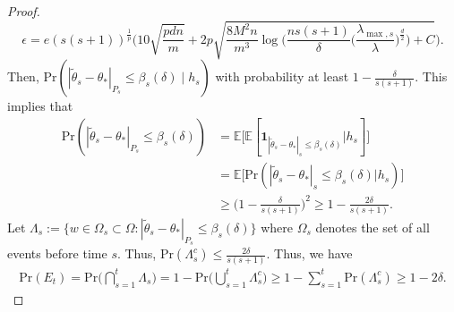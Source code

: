 \documentclass[11pt]{article}
\theoremstyle{plain}
\theoremstyle{definition}
\theoremstyle{remark}
\begin{document}
\begin{proof}
\[\epsilon = e (s(s+1))^{\frac{1}{p}}\Big(10\sqrt{\frac{pdn}{m}}+ 2p \sqrt{\frac{8M^2n}{m^3}\log \big(\frac{n s(s+1)}{\delta}\big(\frac{\lambda_{\max,s}}{\lambda}\big)^{\frac{d}{2}}\big)+C}\Big).\] 
Then, $\mathrm{Pr}(|\tilde{\theta}_s-\theta_*|_{P_s} \leq \beta_s(\delta) \mid h_{s})$
with probability at least $1-\frac{\delta}{s(s+1)}$.
This implies that 
\begin{align*}
\mathrm{Pr}(|\tilde{\theta}_s - \theta_*|_{P_s} \leq \beta_s(\delta)) &= \mathbb{E}\big [\mathbb{E}[\mathbf{1}_{|\tilde  \theta_s - \theta_*|_s \leq \beta_s(\delta)}|h_s]\big ]\\
&=\mathbb{E}\big [\mathrm{Pr}(|\tilde \theta_s - \theta_*|_s \leq \beta_s(\delta)|h_s)\big ] \\
& \geq \bigg (1-\frac{\delta}{s(s+1)}\bigg )^2
\geq 1-\frac{2\delta}{s(s+1)}.
\end{align*}
Let $\Lambda_s := \{w\in \Omega_s \subset \Omega:|\tilde \theta_s-\theta_*|_{P_s}\leq \beta_s(\delta)\}$ where $\Omega_s$ denotes the set of all events before time $s$. %
Thus, 
$\mathrm{Pr} (\Lambda_s^c) \leq \frac{2\delta}{s(s+1)}$. 
Thus, we have
\begin{align*}
  \mathrm{Pr} (E_t) =   \mathrm{Pr} \bigg(\bigcap_{s=1}^{t} \Lambda_s \bigg )=1-\mathrm{Pr}\bigg (\bigcup_{s=1}^{t} \Lambda_s^c \bigg ) \geq 1-\sum_{s=1}^{t} \mathrm{Pr}(\Lambda_s^c)\geq 1- 2\delta.
\end{align*}


\end{proof}
\end{document}

